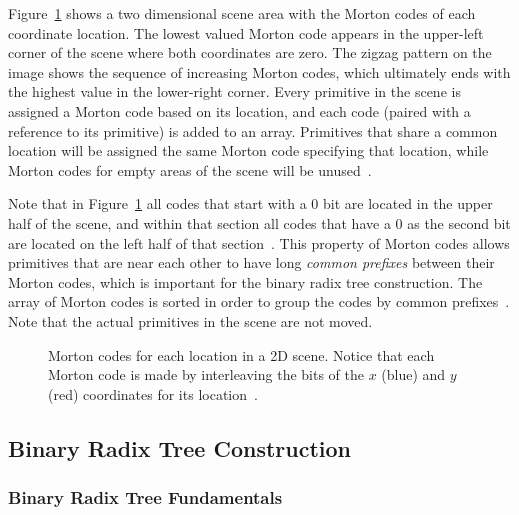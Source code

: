 \documentclass{sig-alternate}
\begin{document}
Figure~\ref{fig:MortonCodeFigure} shows a two dimensional scene area with the Morton codes of each coordinate location. The lowest valued Morton code appears in the upper-left corner of the scene where both coordinates are zero. The zigzag pattern on the image shows the sequence of increasing Morton codes, which ultimately ends with the highest value in the lower-right corner. Every primitive in the scene is assigned a Morton code based on its location, and each code (paired with a reference to its primitive) is added to an array. Primitives that share a common location will be assigned the same Morton code specifying that location, while Morton codes for empty areas of the scene will be unused~\cite{Karras:2012, Viitanen:2015}.

Note that in Figure~\ref{fig:MortonCodeFigure} all codes that start with a 0 bit are located in the upper half of the scene, and within that section all codes that have a 0 as the second bit are located on the left half of that section~\cite{Garanzha:2011}. This property of Morton codes allows primitives that are near each other to have long \emph{common prefixes} between their Morton codes, which is important for the binary radix tree construction. The array of Morton codes is sorted in order to group the codes by common prefixes~\cite{Viitanen:2015}. Note that the actual primitives in the scene are not moved.

\begin{figure}
\centering
{}
\caption{Morton codes for each location in a 2D scene. Notice that each Morton code is made by interleaving the bits of the $x$ (blue) and $y$ (red) coordinates for its location~\cite{wiki:morton}.}
\label{fig:MortonCodeFigure}
\end{figure} 

\subsection{Binary Radix Tree Construction}
\label{sec:brts}

\subsubsection{Binary Radix Tree Fundamentals}
\label{sec:brtFundamentals}
\end{document}
